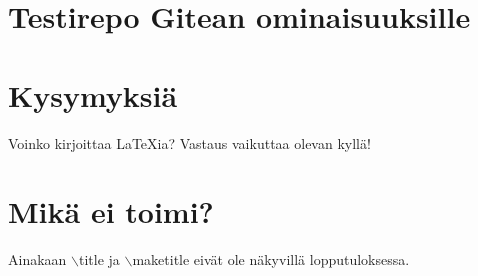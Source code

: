 \documentclass[a4paper]{artikel3}
\begin{document}
\section*{Testirepo Gitean ominaisuuksille}
\section*{Kysymyksiä}
Voinko kirjoittaa \LaTeX ia? Vastaus vaikuttaa olevan kyllä!
\section*{Mikä ei toimi?}
Ainakaan $\backslash$title ja $\backslash$maketitle eivät ole näkyvillä lopputuloksessa.
\end{document}
